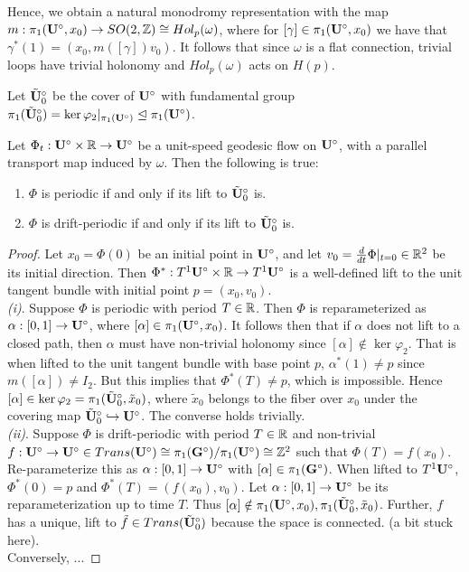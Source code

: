 \documentclass[]{article}
\def\btUos{\btU_0^\circ}
\begin{document}
Hence, we obtain a natural monodromy representation with the map $m:\pi_1(\mathbf{U}^\circ,x_0)\rightarrow SO(2,\mathbb{Z})\cong Hol_p(\omega)$, where for $[\gamma]\in\pi_1(\mathbf{U}^\circ,x_0)$ we have that $\gamma^*(1)=(x_0,m([\gamma])v_0)$. It follows that since $\omega$ is a flat connection, trivial loops have trivial holonomy and $Hol_p(\omega)$ acts on $H(p)$.



\begin{Def}
Let $\btUos$ be the cover of $\mathbf{U}^\circ$ with fundamental group $\pi_1(\btUos)=\ker\varphi_2|_{\pi_1(\bUs)}\trianglelefteq \pi_1(\bUs)$.
\end{Def}

\begin{lem}
Let $\Phi_t:\mathbf{U}^\circ\times\mathbb{R}\rightarrow \mathbf{U}^\circ$ be a unit-speed geodesic flow on $\mathbf{U}^\circ$, with a parallel transport map induced by $\omega$. Then the following is true:
\begin{enumerate}[label=(\roman*)]
\item $\Phi$ is periodic if and only if its lift to $\btUos$ is.
\item $\Phi$ is drift-periodic if and only if its lift to $\btUos$ is. 
\end{enumerate}
\begin{proof}
Let $x_0=\Phi(0)$ be an initial point in $\mathbf{U}^\circ$, and let $v_0=\frac{d}{dt}\Phi|_{t=0}\in\mathbb{R}^2$ be its initial direction. Then $\Phi^*:T^1\mathbf{U}^\circ\times\mathbb{R}\rightarrow T^1\mathbf{U}^\circ$ is a well-defined lift to the unit tangent bundle with initial point $p=(x_0,v_0)$.
\\\emph{(i)}. Suppose $\Phi$ is periodic with period $T\in\mathbb{R}$. Then $\Phi$ is reparameterized as $\alpha:[0,1]\rightarrow \mathbf{U}^\circ$, where $[\alpha]\in\pi_1(\mathbf{U}^\circ,x_0)$. It follows then that if $\alpha$ does not lift to a closed path, then $\alpha$ must have non-trivial holonomy since $[\alpha]\notin\ker\varphi_2$. That is when lifted to the unit tangent bundle with base point $p$, $\alpha^*(1)\neq p$ since $m([\alpha])\neq I_2$. But this implies that $\Phi^*(T)\neq p$, which is impossible. Hence $[\alpha]\in\ker\varphi_2=\pi_1(\btUos,\tilde{x}_0)$, where $\tilde{x}_0$ belongs to the fiber over $x_0$ under the covering map $\btUos\hookrightarrow\bUs$. The converse holds trivially.
\\\emph{(ii)}. Suppose $\Phi$ is drift-periodic with period $T\in\mathbb{R}$ and non-trivial $f:\mathbf{U}^\circ\rightarrow\mathbf{U}^\circ \in Trans(\mathbf{U}^\circ)\cong\pi_1(\mathbf{G}^\circ)/\pi_1(\mathbf{U}^\circ)\cong \mathbb{Z}^2$ such that $\Phi(T)=f(x_0)$. Re-parameterize this as $\alpha:[0,1]\rightarrow\mathbf{U}^\circ$ with $[\alpha]\in\pi_1(\mathbf{G}^\circ)$.  When lifted to $T^1\mathbf{U}^\circ$, $\Phi^*(0)=p$ and $\Phi^*(T)=(f(x_0),v_0)$. Let $\alpha:[0,1]\rightarrow \mathbf{U}^\circ$ be its reparameterization up to time $T$. Thus $[\alpha]\notin \pi_1(\bUs,x_0),\pi_1(\btUos,\tilde{x}_0)$. Further, $f$ has a unique, lift to $\tilde{f}\in Trans(\btUos)$ because the space is connected. (a bit stuck here). \\
Conversely, ...
\end{proof}
\end{lem}
\end{document}
